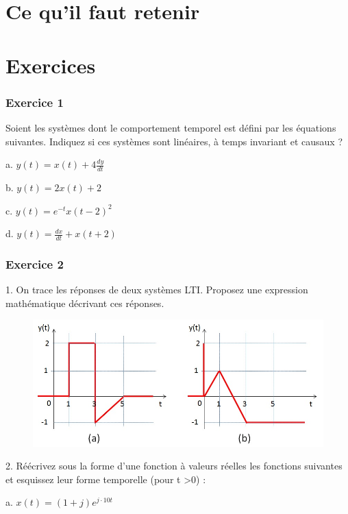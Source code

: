 \documentclass[]{report}
\begin{document}
		
	
	\section{Ce qu'il faut retenir}
	
	
	\section{Exercices}
	
	\subsubsection{Exercice 1} 
	Soient les systèmes dont le comportement temporel est défini par les équations suivantes. Indiquez si ces systèmes sont linéaires, à temps invariant et causaux ?
	
	a. $y(t) = x(t)+4\frac{dy}{dt}$ 
	
	b. $y(t) = 2x(t)+2$ 
	
	c. $y(t)=e^{-t}x(t-2)^{2}$
	
	d. $y(t)=\frac{dx}{dt}+x(t+2)$
	
	\vspace{1\baselineskip}
	
	\subsubsection{Exercice 2} 
	1. On trace les réponses de deux systèmes LTI. Proposez une expression mathématique décrivant ces réponses.
	\begin{figure}[h!]
		\centering
		\includegraphics[scale=0.5]{images/Exo_2_2.jpg} 
	\end{figure} 

	
	2. Réécrivez sous la forme d'une fonction à valeurs réelles les fonctions suivantes et esquissez leur forme temporelle (pour t >0) :
	
	a. $x(t) = (1+j)e^{j\cdot 10t}$ 
	
\end{document}
